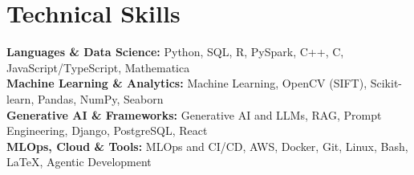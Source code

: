 \medskip

\resumeItemListStart
{}
\resumeItemListEnd
\resumeItemListEnd

\resumeSubHeadingListEnd

\section{Technical Skills}
\begin{itemize}[leftmargin=0.15in, label={}]
  \small{\item{
        \textbf{Languages \& Data Science:} {Python, SQL, R, PySpark, C++, C, JavaScript/TypeScript, Mathematica} \\
        \textbf{Machine Learning \& Analytics:} {Machine Learning, OpenCV (SIFT), Scikit-learn, Pandas, NumPy, Seaborn} \\
        \textbf{Generative AI \& Frameworks:} {Generative AI and LLMs, RAG, Prompt Engineering, Django, PostgreSQL, React} \\
        \textbf{MLOps, Cloud \& Tools:} {MLOps and CI/CD, AWS, Docker, Git, Linux, Bash, \LaTeX\EndAccSupp{}, Agentic Development} \\
        }}
\end{itemize}
